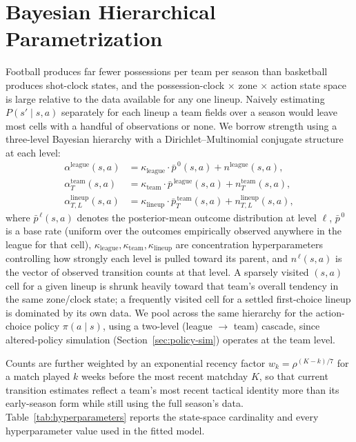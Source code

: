 \documentclass[11pt]{article}
\theoremstyle{plain}
\theoremstyle{definition}
\theoremstyle{remark}
\begin{document}
\section{Bayesian Hierarchical Parametrization}
\label{sec:hierarchy}

Football produces far fewer possessions per team per season than basketball produces shot-clock states, and the possession-clock $\times$ zone $\times$ action state space is large relative to the data available for any one lineup. Naively estimating $P(s' \mid s,a)$ separately for each lineup a team fields over a season would leave most cells with a handful of observations or none. We borrow strength using a three-level Bayesian hierarchy with a Dirichlet--Multinomial conjugate structure at each level:
\begin{align}
\alpha^{\text{league}}(s,a) &= \kappa_{\text{league}} \cdot \bar p^{\,0}(s,a) + n^{\text{league}}(s,a), \\
\alpha^{\text{team}}_T(s,a) &= \kappa_{\text{team}} \cdot \bar p^{\,\text{league}}(s,a) + n^{\text{team}}_T(s,a), \\
\alpha^{\text{lineup}}_{T,L}(s,a) &= \kappa_{\text{lineup}} \cdot \bar p^{\,\text{team}}_T(s,a) + n^{\text{lineup}}_{T,L}(s,a),
\end{align}
where $\bar p^{\,\ell}(s,a)$ denotes the posterior-mean outcome distribution at level $\ell$, $\bar p^{\,0}$ is a base rate (uniform over the outcomes empirically observed anywhere in the league for that cell), $\kappa_{\text{league}}, \kappa_{\text{team}}, \kappa_{\text{lineup}}$ are concentration hyperparameters controlling how strongly each level is pulled toward its parent, and $n^{\,\ell}(s,a)$ is the vector of observed transition counts at that level. A sparsely visited $(s,a)$ cell for a given lineup is shrunk heavily toward that team's overall tendency in the same zone/clock state; a frequently visited cell for a settled first-choice lineup is dominated by its own data. We pool across the same hierarchy for the action-choice policy $\pi(a \mid s)$, using a two-level (league $\to$ team) cascade, since altered-policy simulation (Section~\ref{sec:policy-sim}) operates at the team level.

Counts are further weighted by an exponential recency factor $w_k = \rho^{(K-k)/7}$ for a match played $k$ weeks before the most recent matchday $K$, so that current transition estimates reflect a team's most recent tactical identity more than its early-season form while still using the full season's data. Table~\ref{tab:hyperparameters} reports the state-space cardinality and every hyperparameter value used in the fitted model.
\end{document}
